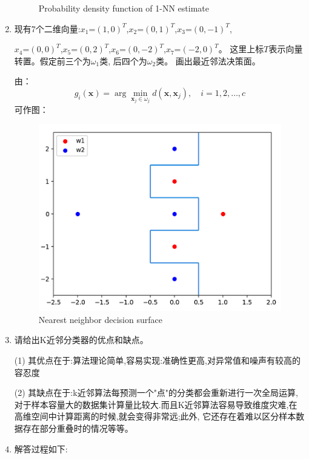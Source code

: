 \documentclass[homework]{IEEEtran}
\begin{document}
\begin{CJK}{UTF8}{gkai}
\begin{enumerate}
\begin{figure}[htb]
                \caption{Probability density function of 1-NN estimate}
                \label{fig}
            \end{figure}
        \item 现有7个二维向量:$x_1$=$(1,0)^T$,$x_2$=$(0,1)^T$,$x_3$=$(0,-1)^T$, \par
        $x_4$=$(0,0)^T$,$x_5$=$(0,2)^T$,$x_6$=$(0,-2)^T$,$x_7$=$(-2,0)^T$。
        这里上标$T$表示向量转置。假定前三个为$\omega_{1}$类, 后四个为$\omega_{2}$类。
        画出最近邻法决策面。\par
        由：$$g_{i}(\mathbf{x})=\arg \min _{\mathbf{x}_{j} \in \omega_{j}} d\left(\mathbf{x}, \mathbf{x}_{j}\right), \quad i=1,2, \ldots, c$$
        可作图：
        \begin{figure}[htb]
            \centerline{\includegraphics{Images/fig2.png}}
            \caption{Nearest neighbor decision surface}
            \label{fig} 
        \end{figure}
        \item 请给出K近邻分类器的优点和缺点。 \par
        (1) 其优点在于:算法理论简单,容易实现:准确性更高,对异常值和噪声有较高的容忍度    \par
        (2) 其缺点在于:k近邻算法每预测一个"点"的分类都会重新进行一次全局运算,对于样本容量大的数据集计算量比较大.而且K近邻算法容易导致维度灾难,在高维空间中计算距离的时候,就会变得非常远;此外,
        它还存在着难以区分样本数据存在部分重叠时的情况等等。 \par
        \item 解答过程如下:
        \begin{figure}[htb]

\end{figure}
\end{enumerate}
\end{CJK}
\end{document}
